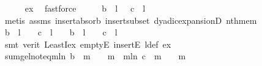 \begin{isabellebody}
\ \ \ \ \isamarkupfalse%
\ ex\ \isamarkupfalse%
\ fastforce\isanewline
\ \ \isamarkupfalse%
\ \isamarkupfalse%
\ {\isachardoublequoteopen}b\ {\isacharbang}{\kern0pt}\ l\ {\isasymin}\ {\isacharbraceleft}{\kern0pt}{}{\isacharcomma}{\kern0pt}{}{\isacharbraceright}{\kern0pt}{\isachardoublequoteclose}\ {\isachardoublequoteopen}c\ {\isacharbang}{\kern0pt}\ l\ {\isasymin}\ {\isacharbraceleft}{\kern0pt}{}{\isacharcomma}{\kern0pt}{}{\isacharbraceright}{\kern0pt}{\isachardoublequoteclose}\isanewline
\ \ \ \ \isamarkupfalse%
\ {\isacharparenleft}{\kern0pt}metis\ assms\ insert{\isacharunderscore}{\kern0pt}absorb\ insert{\isacharunderscore}{\kern0pt}subset\ dyadic{\isacharunderscore}{\kern0pt}expansionD{\isacharparenleft}{\kern0pt}{}{\isacharcomma}{\kern0pt}{}{\isacharparenright}{\kern0pt}\ nth{\isacharunderscore}{\kern0pt}mem{\isacharparenright}{\kern0pt}{\isacharplus}{\kern0pt}\isanewline
\ \ \isamarkupfalse%
\ \isamarkupfalse%
\ {\isachardoublequoteopen}b\ {\isacharbang}{\kern0pt}\ l\ {\isacharequal}{\kern0pt}\ {}\ {\isasymand}\ c\ {\isacharbang}{\kern0pt}\ l\ {\isacharequal}{\kern0pt}\ {}{\isachardoublequoteclose}\ {\isacharbar}{\kern0pt}\ {\isachardoublequoteopen}b\ {\isacharbang}{\kern0pt}\ l\ {\isacharequal}{\kern0pt}\ {}\ {\isasymand}\ c\ {\isacharbang}{\kern0pt}\ l\ {\isacharequal}{\kern0pt}\ {}{\isachardoublequoteclose}\isanewline
\ \ \ \ \isamarkupfalse%
\ {\isacharparenleft}{\kern0pt}smt\ {\isacharparenleft}{\kern0pt}verit{\isacharparenright}{\kern0pt}\ LeastI{\isacharunderscore}{\kern0pt}ex\ emptyE\ insertE\ l{\isacharunderscore}{\kern0pt}def\ ex{\isacharparenright}{\kern0pt}\isanewline
\ \ \isamarkupfalse%
\ \isamarkupfalse%
\ sum{\isacharunderscore}{\kern0pt}ge{\isacharunderscore}{\kern0pt}l{\isacharunderscore}{\kern0pt}noteq{\isacharcolon}{\kern0pt}{\isachardoublequoteopen}{\isacharparenleft}{\kern0pt}{\isasymSum}m{\isasymin}{\isacharbraceleft}{\kern0pt}l{\isacharplus}{\kern0pt}{}{\isachardot}{\kern0pt}{\isachardot}{\kern0pt}n{\isacharbraceright}{\kern0pt}{\isachardot}{\kern0pt}\ {\isacharparenleft}{\kern0pt}b\ {\isacharbang}{\kern0pt}\ {\isacharparenleft}{\kern0pt}m{\isacharminus}{\kern0pt}{}{\isacharparenright}{\kern0pt}{\isacharparenright}{\kern0pt}\ {\isacharslash}{\kern0pt}\ {}\ {\isacharcircum}{\kern0pt}\ m{\isacharparenright}{\kern0pt}\ {\isasymnoteq}\ {\isacharparenleft}{\kern0pt}{\isasymSum}m{\isasymin}{\isacharbraceleft}{\kern0pt}l{\isacharplus}{\kern0pt}{}{\isachardot}{\kern0pt}{\isachardot}{\kern0pt}n{\isacharbraceright}{\kern0pt}{\isachardot}{\kern0pt}\ {\isacharparenleft}{\kern0pt}c\ {\isacharbang}{\kern0pt}\ {\isacharparenleft}{\kern0pt}m{\isacharminus}{\kern0pt}{}{\isacharparenright}{\kern0pt}{\isacharparenright}{\kern0pt}\ {\isacharslash}{\kern0pt}\ {}\ {\isacharcircum}{\kern0pt}\ m{\isacharparenright}{\kern0pt}{\isachardoublequoteclose}\isanewline

\end{isabellebody}
